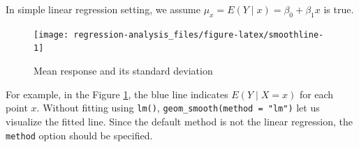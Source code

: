 \documentclass[]{book}
\newenvironment{Shaded}{\begin{snugshade}}{\end{snugshade}}
\newcommand{\CommentTok}[1]{\textcolor[rgb]{0.56,0.35,0.01}{\textit{#1}}}
\newcommand{\DataTypeTok}[1]{\textcolor[rgb]{0.13,0.29,0.53}{#1}}
\newcommand{\FloatTok}[1]{\textcolor[rgb]{0.00,0.00,0.81}{#1}}
\newcommand{\KeywordTok}[1]{\textcolor[rgb]{0.13,0.29,0.53}{\textbf{#1}}}
\newcommand{\NormalTok}[1]{#1}
\newcommand{\OperatorTok}[1]{\textcolor[rgb]{0.81,0.36,0.00}{\textbf{#1}}}
\newcommand{\StringTok}[1]{\textcolor[rgb]{0.31,0.60,0.02}{#1}}
\theoremstyle{definition}
\theoremstyle{definition}
\theoremstyle{definition}
\theoremstyle{remark}
\begin{document}
In simple linear regression setting, we assume \(\mu_x = E(Y \mid x) = \beta_0 + \beta_1 x\) is true.

\begin{Shaded}
\end{Shaded}

\begin{figure}[H]

{\centering \texttt{[image: regression-analysis\_files/figure-latex/smoothline-1]} 

}

\caption{Mean response and its standard deviation}\label{fig:smoothline}
\end{figure}

For example, in the Figure \ref{fig:smoothline}, the blue line indicates \(E(Y \mid X = x)\) for each point \(x\). Without fitting using \texttt{lm()}, \texttt{geom\_smooth(method\ =\ "lm")} let us visualize the fitted line. Since the default method is not the linear regression, the \texttt{method} option should be specified.

\begin{Shaded}
\end{Shaded}
\end{document}
